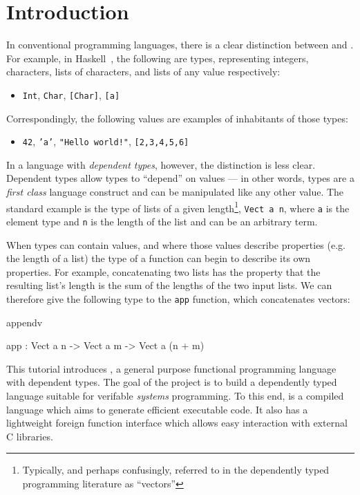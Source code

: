 \section{Introduction}

In conventional programming languages, there is a clear distinction between
 and . For example, in Haskell~\cite{haskell-report},
the following are types, representing integers, characters, lists of characters,
and lists of any value respectively:

\begin{itemize}
\item \texttt{Int}, \texttt{Char}, \texttt{[Char]}, \texttt{[a]}
\end{itemize}

\noindent
Correspondingly, the following values are examples of inhabitants of those types:

\begin{itemize}
\item \texttt{42}, \texttt{'a'}, \texttt{"Hello world!"}, \texttt{[2,3,4,5,6]}
\end{itemize}

\noindent
In a language with \emph{dependent types}, however, the distinction is less
clear.  
Dependent types allow types to ``depend'' on values --- in other words,
types are a \emph{first class} language construct and can be manipulated like
any other value. The standard
example is the type of lists of a given length\footnote{Typically, and perhaps
confusingly, referred to in the dependently typed programming literature as
``vectors''}, \texttt{Vect a n}, where \texttt{a} is the element type and
\texttt{n} is the length of the list and can be an arbitrary
term.

When types can contain values, and where those values describe properties (e.g.
the length of a list)
the type of a function can begin to describe its own properties. For example,
concatenating two lists has the property that the resulting list's length is
the sum of the lengths of the two input lists. We can therefore give the following type 
to the  \texttt{app} function, which concatenates vectors: 

\begin{SaveVerbatim}{appendv}

app : Vect a n -> Vect a m -> Vect a (n + m)

\end{SaveVerbatim}

\noindent
This tutorial introduces \Idris{}, a general purpose functional 
programming language with dependent types.
The goal of the \Idris{} project is to build a dependently typed language suitable
for verifable \emph{systems} programming. To this end, \Idris{} is a compiled language
which aims to generate efficient executable code. It also has a lightweight foreign
function interface which allows easy interaction with external C libraries.

